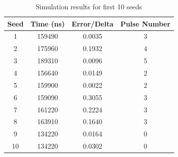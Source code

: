 \begin{table}[h]
\centering
\caption{Simulation results for first 10 seeds}
\begin{tabular}{|c|c|c|c|}
\hline
Seed & Time (ns) & Error/Delta & Pulse Number \\
\hline
1 & 159490 & 0.0035 & 3 \\
2 & 175960 & 0.1932 & 4 \\
3 & 189310 & 0.0096 & 5 \\
4 & 156640 & 0.0149 & 2 \\
5 & 159900 & 0.0022 & 2 \\
6 & 159090 & 0.3055 & 3 \\
7 & 161220 & 0.2224 & 3 \\
8 & 163910 & 0.1640 & 3 \\
9 & 134220 & 0.0164 & 0 \\
10 & 134220 & 0.0302 & 0 \\
\hline
\end{tabular}
\label{table:error_results}
\end{table}


